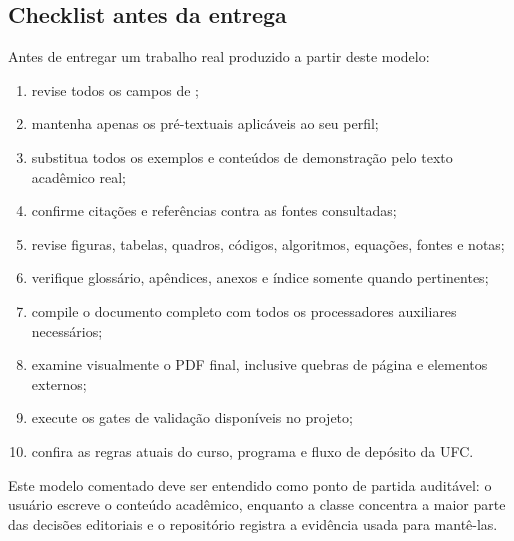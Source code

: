 \subsection{Checklist antes da entrega}

Antes de entregar um trabalho real produzido a partir deste modelo:

\begin{enumerate}
  \item revise todos os campos de \texttt{\string\ufcsetup};
  \item mantenha apenas os pré-textuais aplicáveis ao seu perfil;
  \item substitua todos os exemplos e conteúdos de demonstração pelo texto acadêmico real;
  \item confirme citações e referências contra as fontes consultadas;
  \item revise figuras, tabelas, quadros, códigos, algoritmos, equações, fontes e notas;
  \item verifique glossário, apêndices, anexos e índice somente quando pertinentes;
  \item compile o documento completo com todos os processadores auxiliares necessários;
  \item examine visualmente o PDF final, inclusive quebras de página e elementos externos;
  \item execute os gates de validação disponíveis no projeto;
  \item confira as regras atuais do curso, programa e fluxo de depósito da UFC.
\end{enumerate}


Este modelo comentado deve ser entendido como ponto de partida auditável: o usuário escreve o conteúdo acadêmico, enquanto a classe concentra a maior parte das decisões editoriais e o repositório registra a evidência usada para mantê-las.

